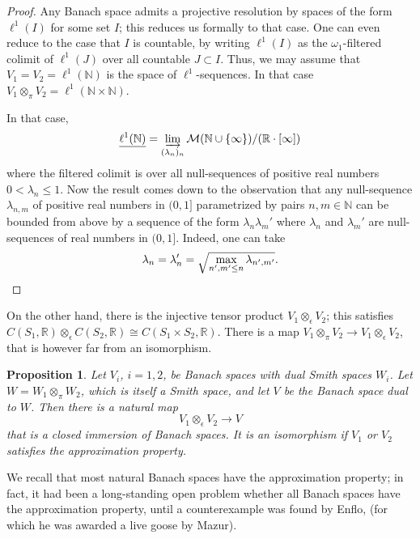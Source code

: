\documentclass[11pt]{amsbook}
\numberwithin{equation}{section}
\numberwithin{theorem}{section}
\newtheorem{proposition}[theorem]{Proposition}
\theoremstyle{definition}
\begin{document}
\begin{proof} Any Banach space admits a projective resolution by spaces of the form $\ell^1(I)$ for some set $I$; this reduces us formally to that case. One can even reduce to the case that $I$ is countable, by writing $\ell^1(I)$ as the $\omega_1$-filtered colimit of $\ell^1(J)$ over all countable $J\subset I$. Thus, we may assume that $V_1=V_2=\ell^1(\mathbb N)$ is the space of $\ell^1$-sequences. In that case $V_1\otimes_\pi V_2 = \ell^1(\mathbb N\times \mathbb N)$.

In that case,
\[
\underline{\ell^1(\mathbb N)} = \varinjlim_{(\lambda_n)_n} \mathcal M(\mathbb N\cup \{\infty\})/(\mathbb R\cdot [\infty])
\]
where the filtered colimit is over all null-sequences of positive real numbers $0<\lambda_n\leq 1$. Now the result comes down to the observation that any null-sequence $\lambda_{n,m}$ of positive real numbers in $(0,1]$ parametrized by pairs $n,m\in \mathbb N$ can be bounded from above by a sequence of the form $\lambda_n \lambda_m'$ where $\lambda_n$ and $\lambda_m'$ are null-sequences of real numbers in $(0,1]$. Indeed, one can take
\[
\lambda_n=\lambda_n' = \sqrt{\max_{n',m'\leq n} \lambda_{n',m'}}.\qedhere
\]
\end{proof}

On the other hand, there is the injective tensor product $V_1\otimes_\epsilon V_2$; this satisfies $C(S_1,\mathbb R)\otimes_\epsilon C(S_2,\mathbb R)\cong C(S_1\times S_2,\mathbb R)$. There is a map $V_1\otimes_\pi V_2\to V_1\otimes_\epsilon V_2$, that is however far from an isomorphism.

\begin{proposition} Let $V_i$, $i=1,2$, be Banach spaces with dual Smith spaces $W_i$. Let $W=W_1\otimes_\pi W_2$, which is itself a Smith space, and let $V$ be the Banach space dual to $W$. Then there is a natural map
\[
V_1\otimes_\epsilon V_2\to V
\]
that is a closed immersion of Banach spaces. It is an isomorphism if $V_1$ or $V_2$ satisfies the approximation property.
\end{proposition}

We recall that most natural Banach spaces have the approximation property; in fact, it had been a long-standing open problem whether all Banach spaces have the approximation property, until a counterexample was found by Enflo, \cite{Enflo} (for which he was awarded a live goose by Mazur).
\end{document}
